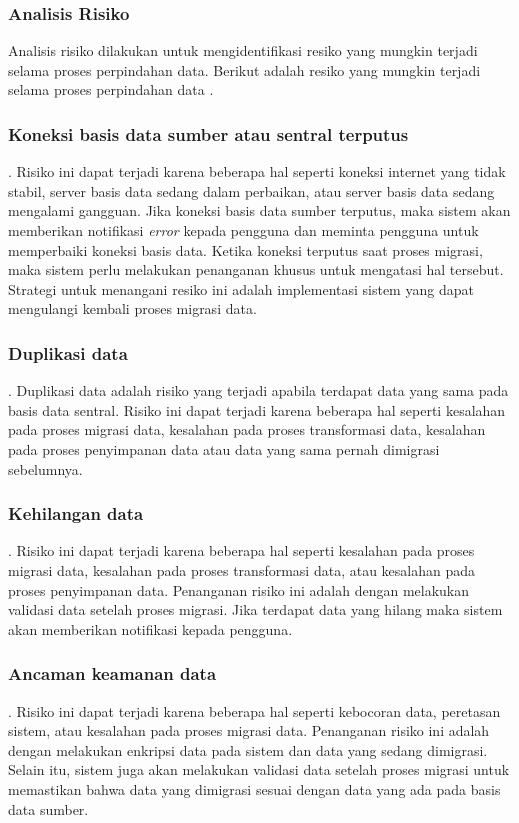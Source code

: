 \subsubsection{Analisis Risiko}
Analisis risiko dilakukan untuk mengidentifikasi resiko yang mungkin terjadi selama proses perpindahan data. Berikut adalah resiko yang mungkin terjadi selama proses perpindahan data \citet{Hussien2021}.
\subsubsection{Koneksi basis data sumber atau sentral terputus}. 
  Risiko ini dapat terjadi karena beberapa hal seperti koneksi internet yang tidak stabil, server basis data sedang dalam perbaikan, atau server basis data sedang mengalami gangguan.  Jika koneksi basis data sumber terputus, maka sistem akan memberikan notifikasi \emph{error} kepada pengguna dan meminta pengguna untuk memperbaiki koneksi basis data. Ketika koneksi terputus saat proses migrasi, maka sistem perlu melakukan penanganan khusus untuk mengatasi hal tersebut. Strategi untuk menangani resiko ini adalah implementasi sistem yang dapat mengulangi kembali proses migrasi data.
  \subsubsection{Duplikasi data}.
  Duplikasi data adalah risiko yang terjadi apabila terdapat data yang sama pada basis data sentral. Risiko ini dapat terjadi karena beberapa hal seperti kesalahan pada proses migrasi data, kesalahan pada proses transformasi data, kesalahan pada proses penyimpanan data atau data yang sama pernah dimigrasi sebelumnya.
  \subsubsection{Kehilangan data}.
  Risiko ini dapat terjadi karena beberapa hal seperti kesalahan pada proses migrasi data, kesalahan pada proses transformasi data, atau kesalahan pada proses penyimpanan data. Penanganan risiko ini adalah dengan melakukan validasi data setelah proses migrasi. Jika terdapat data yang hilang maka sistem akan memberikan notifikasi kepada pengguna.
  \subsubsection{Ancaman keamanan data}.
  Risiko ini dapat terjadi karena beberapa hal seperti kebocoran data, peretasan sistem, atau kesalahan pada proses migrasi data. Penanganan risiko ini adalah dengan melakukan enkripsi data pada sistem dan data yang sedang dimigrasi. Selain itu, sistem juga akan melakukan validasi data setelah proses migrasi untuk memastikan bahwa data yang dimigrasi sesuai dengan data yang ada pada basis data sumber.



